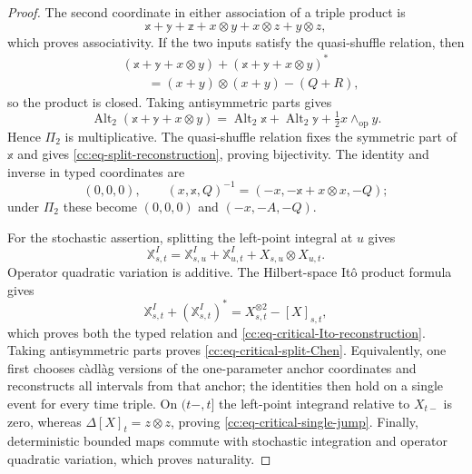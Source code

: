 \documentclass[10pt,reqno]{amsart}
\theoremstyle{plain}
\theoremstyle{definition}
\theoremstyle{remark}
\begin{document}
\begin{proof}
The second coordinate in either association of a triple product is
\[
 \mathbb x+\mathbb y+\mathbb z+x\otimes y+x\otimes z+y\otimes z,
\]
which proves associativity.  If the two inputs satisfy the quasi-shuffle
relation, then
\begin{align*}
 &(\mathbb x+\mathbb y+x\otimes y)
  +(\mathbb x+\mathbb y+x\otimes y)^*\\
 &\qquad=(x+y)\otimes(x+y)-(Q+R),
\end{align*}
so the product is closed.  Taking antisymmetric parts gives
\[
 \operatorname{Alt}_2(\mathbb x+\mathbb y+x\otimes y)
 =\operatorname{Alt}_2\mathbb x+\operatorname{Alt}_2\mathbb y
  +\tfrac12x\wedge_{\mathrm{op}}y.
\]
Hence \(\Pi_2\) is multiplicative.  The quasi-shuffle relation fixes the
symmetric part of \(\mathbb x\) and gives
\eqref{cc:eq-split-reconstruction}, proving bijectivity.  The identity and
inverse in typed coordinates are
\[
 (0,0,0),\qquad
 (x,\mathbb x,Q)^{-1}=(-x,-\mathbb x+x\otimes x,-Q);
\]
under \(\Pi_2\) these become \((0,0,0)\) and \((-x,-A,-Q)\).

For the stochastic assertion, splitting the left-point integral at \(u\)
gives
\[
 \mathbb X^I_{s,t}
 =\mathbb X^I_{s,u}+\mathbb X^I_{u,t}
  +X_{s,u}\otimes X_{u,t}.
\]
Operator quadratic variation is additive.  The Hilbert-space It\^o product
formula gives
\[
 \mathbb X^I_{s,t}+(\mathbb X^I_{s,t})^*
 =X_{s,t}^{\otimes 2}-[X]_{s,t},
\]
which proves both the typed relation and
\eqref{cc:eq-critical-Ito-reconstruction}.  Taking antisymmetric parts
proves \eqref{cc:eq-critical-split-Chen}.  Equivalently, one first chooses
c\`adl\`ag versions of the one-parameter anchor coordinates and reconstructs
all intervals from that anchor; the identities then hold on a single event
for every time triple.  On \((t-,t]\) the left-point integrand relative to
\(X_{t-}\) is zero, whereas
\(\Delta[X]_t=z\otimes z\), proving
\eqref{cc:eq-critical-single-jump}.  Finally, deterministic bounded maps
commute with stochastic integration and operator quadratic variation, which
proves naturality.
\end{proof}
\end{document}
